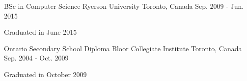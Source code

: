 \begin{cventries}
  \cventry
    {BSc in Computer Science}
    {Ryerson University}
    {Toronto, Canada}
    {Sep. 2009 - Jun. 2015}
    {
      \begin{cvitems}
        \item {Graduated in June 2015}
      \end{cvitems}
    }
    \cventry
     {Ontario Secondary School Diploma}
    {Bloor Collegiate Institute}
    {Toronto, Canada}
    {Sep. 2004 - Oct. 2009}
    {
      \begin{cvitems}
        \item {Graduated in October 2009}
      \end{cvitems}
    }
\end{cventries}
